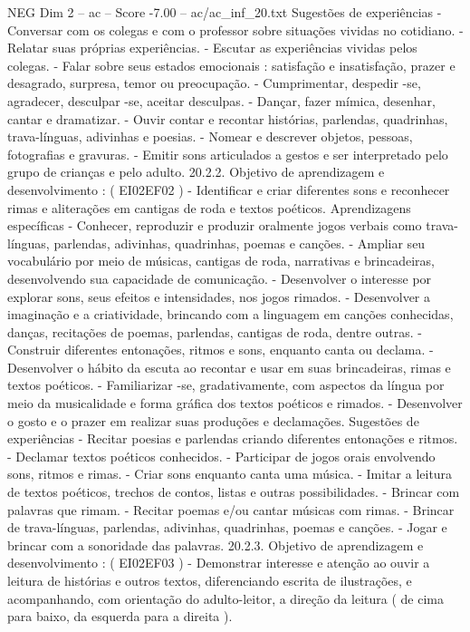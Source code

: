 \begin{textsample}{NEG Dim 2 – ac – Score -7.00 – ac/ac\_inf\_20.txt}
Sugestões de experiências - Conversar com os colegas e com o professor sobre situações vividas no cotidiano. - Relatar suas próprias experiências. - Escutar as experiências vividas pelos colegas. - Falar sobre seus estados emocionais : satisfação e insatisfação, prazer e desagrado, surpresa, temor ou preocupação. - Cumprimentar, despedir -se, agradecer, desculpar -se, aceitar desculpas. - Dançar, fazer mímica, desenhar, cantar e dramatizar. - Ouvir contar e recontar histórias, parlendas, quadrinhas, trava-línguas, adivinhas e poesias. - Nomear e descrever objetos, pessoas, fotografias e gravuras. - Emitir sons articulados a gestos e ser interpretado pelo grupo de crianças e pelo adulto. 20.2.2.
Objetivo de aprendizagem e desenvolvimento : ( EI02EF02 ) - Identificar e criar diferentes sons e reconhecer rimas e aliterações em cantigas de roda e textos poéticos.
Aprendizagens específicas - Conhecer, reproduzir e produzir oralmente jogos verbais como trava-línguas, parlendas, adivinhas, quadrinhas, poemas e canções. - Ampliar seu vocabulário por meio de músicas, cantigas de roda, narrativas e brincadeiras, desenvolvendo sua capacidade de comunicação. - Desenvolver o interesse por explorar sons, seus efeitos e intensidades, nos jogos rimados. - Desenvolver a imaginação e a criatividade, brincando com a linguagem em canções conhecidas, danças, recitações de poemas, parlendas, cantigas de roda, dentre outras. - Construir diferentes entonações, ritmos e sons, enquanto canta ou declama. - Desenvolver o hábito da escuta ao recontar e usar em suas brincadeiras, rimas e textos poéticos. - Familiarizar -se, gradativamente, com aspectos da língua por meio da musicalidade e forma gráfica dos textos poéticos e rimados. - Desenvolver o gosto e o prazer em realizar suas produções e declamações.
Sugestões de experiências - Recitar poesias e parlendas criando diferentes entonações e ritmos. - Declamar textos poéticos conhecidos. - Participar de jogos orais envolvendo sons, ritmos e rimas. - Criar sons enquanto canta uma música. - Imitar a leitura de textos poéticos, trechos de contos, listas e outras possibilidades. - Brincar com palavras que rimam. - Recitar poemas e/ou cantar músicas com rimas. - Brincar de trava-línguas, parlendas, adivinhas, quadrinhas, poemas e canções. - Jogar e brincar com a sonoridade das palavras. 20.2.3.
Objetivo de aprendizagem e desenvolvimento : ( EI02EF03 ) - Demonstrar interesse e atenção ao ouvir a leitura de histórias e outros textos, diferenciando escrita de ilustrações, e acompanhando, com orientação do adulto-leitor, a direção da leitura ( de cima para baixo, da esquerda para a direita ).

\end{textsample}
